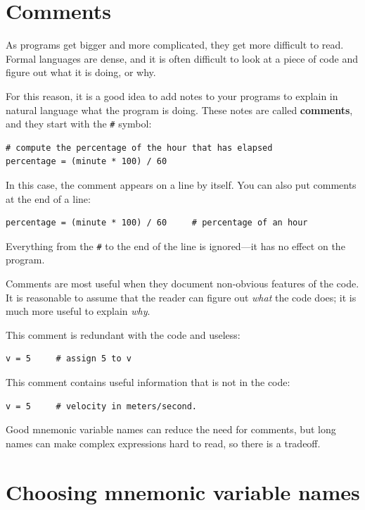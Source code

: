 \documentclass[10pt]{book}
\begin{document}


\section{Comments}

As programs get bigger and more complicated, they get more difficult
to read.  Formal languages are dense, and it is often difficult to
look at a piece of code and figure out what it is doing, or why.

For this reason, it is a good idea to add notes to your programs to explain
in natural language what the program is doing.  These notes are called
{\bf comments}, and they start with the \verb"#" symbol:

\beforeverb
\begin{verbatim}
# compute the percentage of the hour that has elapsed
percentage = (minute * 100) / 60
\end{verbatim}
\afterverb
%
In this case, the comment appears on a line by itself.  You can also put
comments at the end of a line:

\beforeverb
\begin{verbatim}
percentage = (minute * 100) / 60     # percentage of an hour
\end{verbatim}
\afterverb
%
Everything from the {\tt \#} to the end of the line is ignored---it
has no effect on the program.

Comments are most useful when they document non-obvious features of
the code.  It is reasonable to assume that the reader can figure out
{\em what} the code does; it is much more useful to explain {\em why}.

This comment is redundant with the code and useless:

\beforeverb
\begin{verbatim}
v = 5     # assign 5 to v
\end{verbatim}
\afterverb
%
This comment contains useful information that is not in the code:

\beforeverb
\begin{verbatim}
v = 5     # velocity in meters/second. 
\end{verbatim}
\afterverb
%
Good mnemonic variable names can reduce the need for comments, but
long names can make complex expressions hard to read, so there is
a tradeoff.

\section{Choosing mnemonic variable names}
\end{document}
